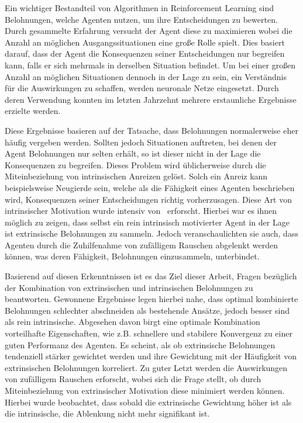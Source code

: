 \documentclass[draft,final]{vutinfth} %
\begin{document}
    \begin{kurzfassung}
        Ein wichtiger Bestandteil von Algorithmen in Reinforcement Learning sind Belohnungen, welche Agenten nutzen, um ihre Entscheidungen zu bewerten.
        Durch gesammelte Erfahrung versucht der Agent diese zu maximieren wobei die Anzahl an möglichen Ausgangssituationen eine große Rolle spielt.
        Dies basiert darauf, dass der Agent die Konsequenzen seiner Entscheidungen nur begreifen kann, falls er sich mehrmals in derselben Situation befindet.
        Um bei einer großen Anzahl an möglichen Situationen dennoch in der Lage zu sein, ein Verständnis für die Auswirkungen zu schaffen, werden neuronale Netze eingesetzt.
        Durch deren Verwendung konnten im letzten Jahrzehnt mehrere erstaunliche Ergebnisse erzielte werden.

        Diese Ergebnisse basieren auf der Tatsache, dass Belohnungen normalerweise eher häufig vergeben werden.
        Sollten jedoch Situationen auftreten, bei denen der Agent Belohnungen nur selten erhält, so ist dieser nicht in der Lage die Konsequenzen zu begreifen.
        Dieses Problem wird üblicherweise durch die Miteinbeziehung von intrinsischen Anreizen gelöst.
        Solch ein Anreiz kann beispielsweise Neugierde sein, welche als die Fähigkeit eines Agenten beschrieben wird, Konsequenzen seiner Entscheidungen richtig vorherzusagen.
        Diese Art von intrinsischer Motivation wurde intensiv von~\cite{burda_large-scale_2018-1} erforscht.
        Hierbei war es ihnen möglich zu zeigen, dass selbst ein rein intrinsisch motivierter Agent in der Lage ist extrinsische Belohnungen zu sammeln.
        Jedoch veranschaulichten sie auch, dass Agenten durch die Zuhilfenahme von zufälligem Rauschen abgelenkt werden können, was deren Fähigkeit, Belohnungen einzusammeln, unterbindet.

        Basierend auf diesen Erkenntnissen ist es das Ziel dieser Arbeit, Fragen bezüglich der Kombination von extrinsischen und intrinsischen Belohnungen zu beantworten.
        Gewonnene Ergebnisse legen hierbei nahe, dass optimal kombinierte Belohnungen schlechter abschneiden als bestehende Ansätze, jedoch besser sind als rein intrinsische.
        Abgesehen davon birgt eine optimale Kombination vorteilhafte Eigenschaften, wie z.B. schnellere und stabilere Konvergenz zu einer guten Performanz des Agenten.
        Es scheint, als ob extrinsische Belohnungen tendenziell stärker gewichtet werden und ihre Gewichtung mit der Häufigkeit von extrinsischen Belohnungen korreliert.
        Zu guter Letzt werden die Auswirkungen von zufälligem Rauschen erforscht, wobei sich die Frage stellt, ob durch Miteinbeziehung von extrinsischer Motivation diese minimiert werden können.
        Hierbei wurde beobachtet, dass sobald die extrinsische Gewichtung höher ist als die intrinsische, die Ablenkung nicht mehr signifikant ist.
    \end{kurzfassung}
\end{document}

